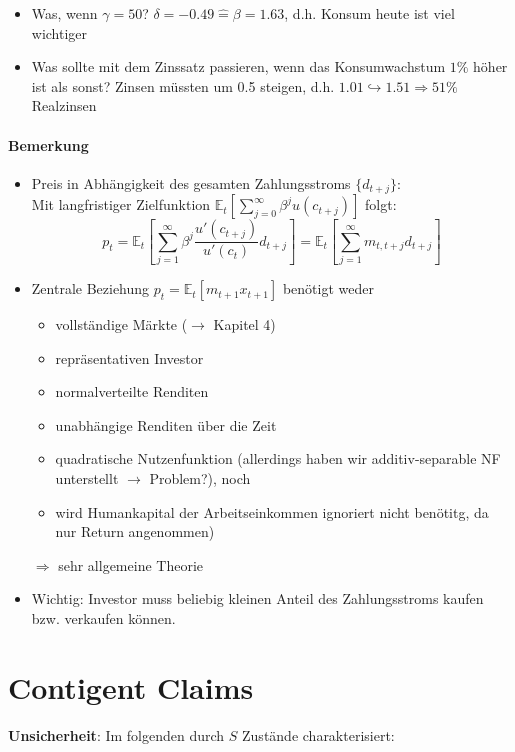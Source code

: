 \documentclass[12pt]{extreport} %
\theoremstyle{named}
\theoremstyle{nnamed}
\theoremstyle{itshape}
\theoremstyle{normal}
\begin{document}
\begin{itemize}
	\item Was, wenn $\gamma = 50$? $\delta = -0.49 \hat{=} \beta = 1.63$, d.h. Konsum heute ist viel wichtiger
	\item Was sollte mit dem Zinssatz passieren, wenn das Konsumwachstum $1\%$ höher ist als sonst? Zinsen müssten um 0.5 steigen, d.h. $1.01 \hookrightarrow 1.51 \Rightarrow 51\%$ Realzinsen
\end{itemize}

\subsubsection*{Bemerkung}
\begin{itemize}
	\item Preis in Abhängigkeit des gesamten Zahlungsstroms $\{ d_{t+j} \}$: ~\\
		Mit langfristiger Zielfunktion $\mathbb{E}_t \left[ \sum_{j=0}^\infty \beta^j u(c_{t+j}) \right]$ folgt:
		$$ p_t = \mathbb{E}_t \left[ \sum_{j=1}^\infty \beta^j \frac{u'(c_{t+j})}{u'(c_t)} d_{t+j} \right] = \mathbb{E}_t \left[ \sum_{j=1}^\infty m_{t,t+j} d_{t+j} \right]  $$
	\item Zentrale Beziehung $p_t = \mathbb{E}_t \left[ m_{t+1} x_{t+1} \right]$ benötigt weder
		\begin{itemize}
			\item vollständige Märkte ($\rightarrow$ Kapitel 4)
			\item repräsentativen Investor
			\item normalverteilte Renditen
			\item unabhängige Renditen über die Zeit
			\item quadratische Nutzenfunktion (allerdings haben wir additiv-separable NF unterstellt $\rightarrow$ Problem?), noch
			\item wird Humankapital der Arbeitseinkommen ignoriert nicht benötitg, da nur Return angenommen)
		\end{itemize}
		$\Rightarrow$ sehr allgemeine Theorie
	\item Wichtig: Investor muss beliebig kleinen Anteil des Zahlungsstroms kaufen bzw. verkaufen können.
\end{itemize}

\chapter{Contigent Claims}

\textbf{Unsicherheit}: Im folgenden durch $S$ Zustände charakterisiert:
	
\end{document}
